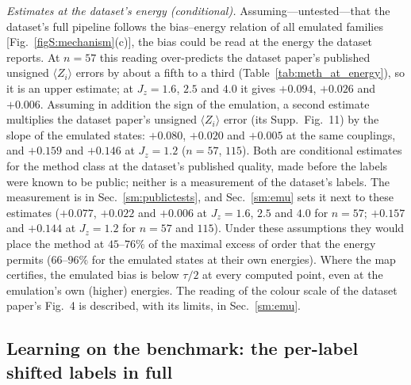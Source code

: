 \documentclass[aps,prx,onecolumn,10pt,nofootinbib,longbibliography,floatfix]{revtex4-2}
\theoremstyle{remark}
\newcommand{\Jz}{J_z}
\begin{document}
\emph{Estimates at the dataset's energy (conditional).} Assuming---untested---that the dataset's full pipeline
follows the bias--energy relation of all emulated families [Fig.~\ref{figS:mechanism}(c)], the bias could be read at
the energy the dataset reports. At $n=57$ this reading over-predicts the dataset paper's published unsigned %
$\langle Z_i\rangle$ errors by about a fifth to a third (Table~\ref{tab:meth_at_energy}), so it is an upper estimate; at $\Jz=1.6$, $2.5$ and $4.0$ it gives %
$+0.094$, $+0.026$ and $+0.006$. Assuming in addition the sign of the emulation, a second estimate multiplies the %
dataset paper's unsigned $\langle Z_i\rangle$ error (its Supp.\ Fig.~11) by the slope of the emulated states:
$+0.080$, $+0.020$ and $+0.005$ at the same couplings, and $+0.159$ and $+0.146$ at $\Jz=1.2$ ($n=57$, $115$). Both %
are conditional estimates for the method class at the dataset's published quality, made before the labels were known
to be public; neither is a measurement of the dataset's labels. The measurement is in Sec.~\ref{sm:publictests}, and
Sec.~\ref{sm:emu} sets it next to these estimates ($+0.077$, $+0.022$ and $+0.006$ at $\Jz=1.6$, $2.5$ and $4.0$ for %
$n=57$; $+0.157$ and $+0.144$ at $\Jz=1.2$ for $n=57$ and $115$). %
Under these assumptions they would place the method at $45$--$76\%$ of the maximal excess of order %
that the energy permits ($66$--$96\%$ for the emulated states at their own energies). Where the map certifies, the %
emulated bias is below $\tau/2$ at every computed point, even at the emulation's own (higher) energies. The reading of
the colour scale of the dataset paper's Fig.~4 is described, with its limits, in Sec.~\ref{sm:emu}.

\subsection{Learning on the benchmark: the per-label shifted labels in full}
\end{document}
